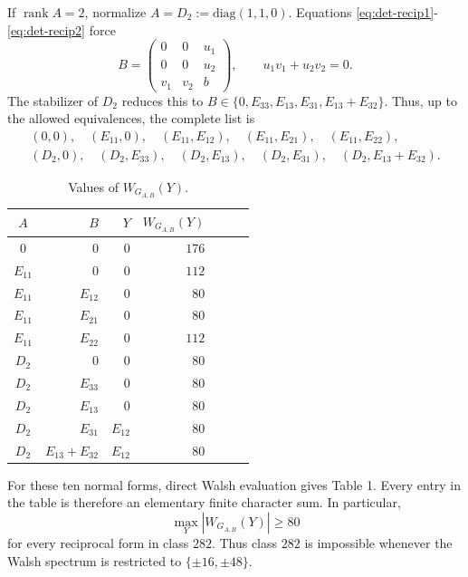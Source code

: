 \documentclass[11pt]{article}
\newtheorem{open problem}{Open problem}
\begin{document}
\begin{appendix}
If $\operatorname{rank} A=2$, normalize $A=D_2:=\text{diag}(1,1,0)$.
Equations \eqref{eq:det-recip1}-\eqref{eq:det-recip2} force
\begin{equation}
B=
\begin{pmatrix}
0&0&u_1\\
0&0&u_2\\
v_1&v_2&b
\end{pmatrix},
\qquad
u_1v_1+u_2v_2=0.
\label{eq:B-rank2}
\end{equation}
The stabilizer of $D_2$ reduces this to
$
B\in
\{0,E_{33},E_{13},E_{31},E_{13}+E_{32}\}.
$
Thus, up to the allowed equivalences, the complete list is
\begin{equation}
\begin{gathered}
(0,0),\quad (E_{11},0),\quad(E_{11},E_{12}),\quad(E_{11},E_{21}),\quad(E_{11},E_{22}),\\
(D_2,0),\quad(D_2,E_{33}),\quad(D_2,E_{13}),\quad(D_2,E_{31}),\quad(D_2,E_{13}+E_{32}).
\end{gathered}
\label{eq:det-list}
\end{equation}


\begin{table}[!h]
\centering
\caption{Values of $W_{G_{A,B}}(Y)$.} \label{tab:enumeration1}
\setlength{\tabcolsep}{5pt}
\begin{tabular}{@{}crrrrrr@{}}
\hline
$A$ & $B$ & $Y$ & $W_{G_{A,B}}(Y)$\\
\hline
$0$ & $0$ & $0$ & $176$\\
$E_{11}$ & $0$ & $0$ & $112$\\
$E_{11}$ & $E_{12}$ & $0$ & $80$\\
$E_{11}$ & $E_{21}$ & $0$ & $80$\\
$E_{11}$ & $E_{22}$ & $0$ & $112$\\
$D_2$ & $0$ & $0$ & $80$\\
$D_2$ & $E_{33}$ & $0$ & $80$\\
$D_2$ & $E_{13}$ & $0$ & $80$\\
$D_2$ & $E_{31}$ & $E_{12}$ & $80$\\
$D_2$ & $E_{13}+E_{32}$ & $E_{12}$ & $80$\\
\hline
\end{tabular}
\end{table}

For these ten normal forms, direct Walsh evaluation gives Table 1. Every entry in the table is therefore an elementary finite character sum.
In particular,
\begin{equation}
\max_Y|W_{G_{A,B}}(Y)|\ge80
\end{equation}
for every reciprocal form in class $282$.
Thus class $282$ is impossible whenever the Walsh spectrum is restricted to
$\{\pm16,\pm48\}$.


\end{appendix}
\end{document}
